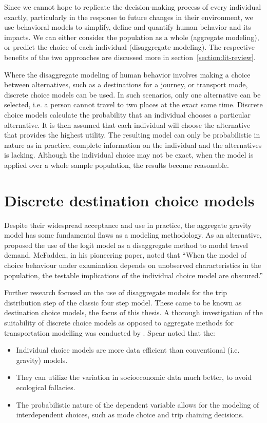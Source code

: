 Since we cannot hope to replicate the decision-making process of every individual exactly, particularly in the response to future changes in their environment,  we use behavioral models to simplify, define and quantify human behavior and its impacts. We can either consider the population as a whole (aggregate modeling), or predict the choice of each individual (disaggregate modeling). The respective benefits of the two approaches are discussed more in section~\ref{section:lit-review}.

Where the disaggregate modeling of human behavior involves making a choice between alternatives, such as a destinations for a journey, or transport mode, discrete choice models can be used. In such scenarios, only one alternative can be selected, i.e. a person cannot travel to two places at the exact same time. Discrete choice models calculate the probability that an individual chooses a particular alternative. It is then assumed that each individual will choose the alternative that provides the highest utility. The resulting model can only be probabilistic in nature as in practice, complete information on the individual and the alternatives is lacking. Although the individual choice may not be exact, when the model is applied  over a whole sample population, the results become reasonable.  


\section{Discrete destination choice models}
Despite their widespread acceptance and use in practice, the aggregate gravity model has some fundamental flaws as a modeling methodology. As an alternative, \textcite{McFadden73, Akiva74} proposed the use of the logit model as a disaggregate method to model travel demand. McFadden, in his pioneering paper, noted that \enquote{When the model of choice behaviour under examination depends on unobserved characteristics in the population, the testable implications of the individual choice model are obscured.}\parencite{McFadden73}

Further research focused on the use of disaggregate models for the trip distribution step of the classic four step model. These came to be known as destination choice models, the focus of this thesis. A thorough investigation of the suitability of discrete choice models as opposed to aggregate methods for transportation modelling was conducted by \textcite{Spear77}. Spear noted that the:
\begin{itemize}
\item Individual choice models are more data efficient than conventional (i.e. gravity) models.
\item They can utilize the variation in socioeconomic data much better, to avoid ecological fallacies.
\item The probabilistic nature of the dependent variable allows for the modeling of interdependent choices, such as mode choice and trip chaining decisions. 
\end{itemize}
	
